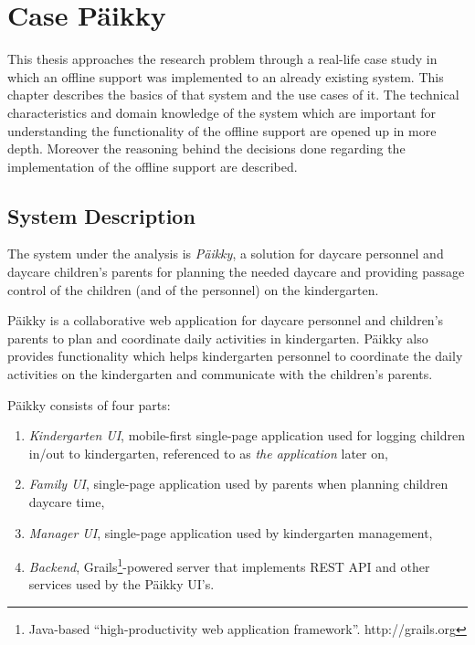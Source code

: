 
\chapter{Case Päikky}

This thesis approaches the research problem through a real-life case study in which an offline support was implemented to an already existing system. This chapter describes the basics of that system and the use cases of it. The technical characteristics and domain knowledge of the system which are important for understanding the functionality of the offline support are opened up in more depth. Moreover the reasoning behind the decisions done regarding the implementation of the offline support are described.


\section{System Description}

The system under the analysis is \textit{Päikky}, a solution for daycare personnel and daycare children’s parents for planning the needed daycare and providing passage control of the children (and of the personnel) on the kindergarten. 

Päikky is a collaborative web application for daycare personnel and children's parents to plan and coordinate daily activities in kindergarten. Päikky also provides functionality which helps kindergarten personnel to coordinate the daily activities on the kindergarten and communicate with the children's parents.

Päikky consists of four parts:

\begin{enumerate}
	\item \textit{Kindergarten UI}, mobile-first single-page application used for logging children in/out to kindergarten, referenced to as \textit{the application} later on,
	\item \textit{Family UI}, single-page application used by parents when planning children daycare time,
	\item \textit{Manager UI}, single-page application used by kindergarten management,
	\item \textit{Backend}, Grails\footnote{Java-based ``high-productivity web application framework''. http://grails.org}-powered server that implements REST API and other services used by the Päikky UI's.
\end{enumerate}

